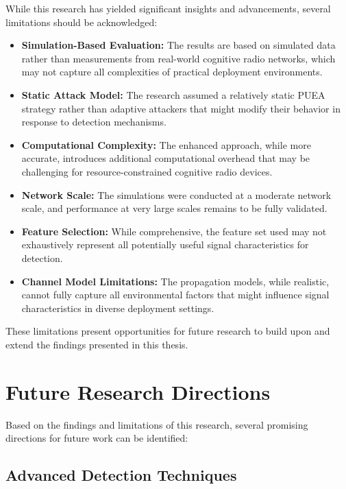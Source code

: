 While this research has yielded significant insights and advancements, several limitations should be acknowledged:

\begin{itemize}
    \item \textbf{Simulation-Based Evaluation:} The results are based on simulated data rather than measurements from real-world cognitive radio networks, which may not capture all complexities of practical deployment environments.

    \item \textbf{Static Attack Model:} The research assumed a relatively static PUEA strategy rather than adaptive attackers that might modify their behavior in response to detection mechanisms.

    \item \textbf{Computational Complexity:} The enhanced approach, while more accurate, introduces additional computational overhead that may be challenging for resource-constrained cognitive radio devices.

    \item \textbf{Network Scale:} The simulations were conducted at a moderate network scale, and performance at very large scales remains to be fully validated.

    \item \textbf{Feature Selection:} While comprehensive, the feature set used may not exhaustively represent all potentially useful signal characteristics for detection.
    
    \item \textbf{Channel Model Limitations:} The propagation models, while realistic, cannot fully capture all environmental factors that might influence signal characteristics in diverse deployment settings.
\end{itemize}

These limitations present opportunities for future research to build upon and extend the findings presented in this thesis.

\section{Future Research Directions}

Based on the findings and limitations of this research, several promising directions for future work can be identified:

\subsection{Advanced Detection Techniques}

